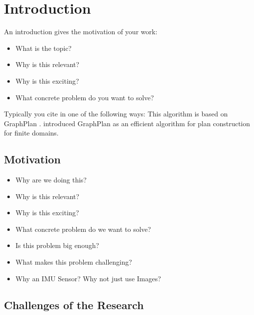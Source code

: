 \chapter{Introduction} \label{chapter_one}

An introduction gives the motivation of your work:
\begin{itemize}
\item What is the topic?
\item Why is this relevant?
\item Why is this exciting?
\item What concrete problem do you want to solve?
\end{itemize} 

Typically you cite in one of the following ways: This algorithm is based on {\sc GraphPlan} \citet{woodman2007introduction}. \citet{woodman2007introduction} introduced {\sc GraphPlan} as an efficient algorithm for plan construction for finite domains.

\section{Motivation}
\begin{itemize}
\item Why are we doing this?
\item Why is this relevant?
\item Why is this exciting?
\item What concrete problem do we want to solve?
\item Is this problem big enough?
\item What makes this problem challenging?
\item Why an IMU Sensor? Why not just use Images?
\end{itemize}

\section{Challenges of the Research}

